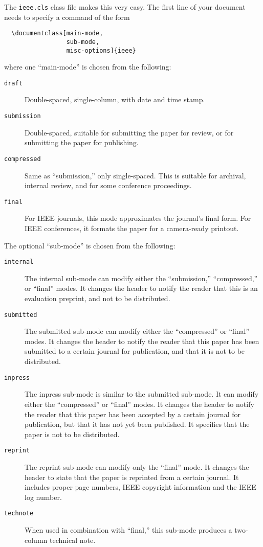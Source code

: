 \documentclass[%
	final,
	reprint,
	notitlepage,
	narroweqnarray,
	inline,
	twoside,
        invited,
	]{ieee}
\begin{document}
The \texttt{ieee.cls} class file makes this very easy.  The first line
of your document needs to specify a command of the form
\begin{verbatim}
  \documentclass[main-mode,
                 sub-mode,
                 misc-options]{ieee}
\end{verbatim}
where one ``main-mode'' is chosen from the following:
\begin{description}
\item[\texttt{draft}] Double-spaced, single-column, with date and time
     stamp.
\item[\texttt{submission}] Double-spaced, suitable for submitting the
     paper for review, or for submitting the paper for publishing.
\item[\texttt{compressed}] Same as ``submission,'' only single-spaced.
     This is suitable for archival, internal review, and for some 
     conference proceedings. 
\item[\texttt{final}] For IEEE journals, this mode approximates the
     journal's final form. For IEEE conferences, it formats
     the paper for a camera-ready printout.
\end{description}
The optional ``sub-mode'' is chosen from the following:
\begin{description}
\item[\texttt{internal}] The internal sub-mode can modify either the
    ``submission,'' 
    ``compressed,'' or ``final'' modes. It changes the header to notify 
    the reader that this is an evaluation preprint, and not to be
    distributed. 
\item[\texttt{submitted}] The submitted sub-mode can modify either the
    ``compressed'' or ``final'' modes. It changes the header to notify 
    the reader that this paper has been submitted to a certain journal 
    for publication, and that it is not to be distributed.
\item[\texttt{inpress}] The inpress sub-mode is similar to the submitted 
    sub-mode. It can modify either the ``compressed'' or ``final'' modes. 
    It changes the header to notify the 
    reader that this paper has been accepted by a certain journal for 
    publication, but that it has not yet been published. It specifies that 
    the paper is not to be distributed.
\item[\texttt{reprint}] The reprint sub-mode can modify only the ``final''
    mode. It changes the header to state that the paper is reprinted
    from a certain journal. It includes proper page numbers, IEEE
    copyright information and the IEEE log number.
\item[\texttt{technote}] When used in combination with ``final,''
    this sub-mode produces a two-column technical note.
\end{description}
\end{document}
